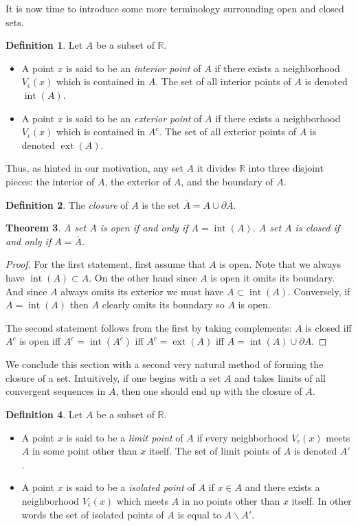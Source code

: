 \documentclass[11pt,oneside]{amsbook}
\newcommand{\RR}{\mathbb R}
\DeclareMathOperator{\inte}{int}
\DeclareMathOperator{\ext}{ext}
\theoremstyle{definition}
\theoremstyle{plain}
\newtheorem{thm}{Theorem}[section]
\theoremstyle{definition}
\newtheorem{defn}[thm]{Definition}
\theoremstyle{remark}
\numberwithin{equation}{section}
\numberwithin{figure}{section}
\begin{document}
It is now time to introduce some more terminology surrounding open and closed sets.

\begin{defn}
  Let $A$ be a subset of $\RR$.
  \begin{itemize}
  \item A point $x$ is said to be an \emph{interior point} of $A$ if there exists a neighborhood $V_\epsilon(x)$ which is contained in $A$. The set of all interior points of $A$ is denoted $\inte(A)$.
  \item A point $x$ is said to be an \emph{exterior point} of $A$ if there exists a neighborhood $V_\epsilon(x)$ which is contained in $A^c$. The set of all exterior points of $A$ is denoted $\ext(A)$.
  \end{itemize}
\end{defn}

Thus, as hinted in our motivation, any set $A$ it divides $\RR$ into three disjoint pieces: the interior of $A$, the exterior of $A$, and the boundary of $A$.

\begin{defn}
  The \emph{closure} of $A$ is the set $\overline{A}=A\cup\partial A$.
\end{defn}

\begin{thm}
  \label{thm:closure}
  A set $A$ is open if and only if $A=\inte(A)$. A set $A$ is closed if and only if $A=\overline{A}$.
\end{thm}

\begin{proof}
  For the first statement, first assume that $A$ is open. Note that we always have $\inte(A)\subset A$. On the other hand since $A$ is open it omits its boundary. And since $A$ always omits its exterior we must have $A\subset\inte(A)$. Conversely, if $A=\inte(A)$ then $A$ clearly omits its boundary so $A$ is open.

  The second statement follows from the first by taking complements: $A$ is closed iff $A^c$ is open iff $A^c=\inte(A^c)$ iff $A^c=\ext(A)$ iff $A=\inte(A)\cup\partial A$.
\end{proof}

We conclude this section with a second very natural method of forming the closure of a set. Intuitively, if one begins with a set $A$ and takes limits of all convergent sequences in $A$, then one should end up with the closure of $A$.

\begin{defn}
  Let $A$ be a subset of $\RR$.
  \begin{itemize}
  \item A point $x$ is said to be a \emph{limit point} of $A$ if every neighborhood $V_\epsilon(x)$ meets $A$ in some point other than $x$ itself. The set of limit points of $A$ is denoted $A'$.
  \item A point $x$ is said to be a \emph{isolated point} of $A$ if $x\in A$ and there exists a neighborhood $V_\epsilon(x)$ which meets $A$ in no points other than $x$ itself. In other words the set of isolated points of $A$ is equal to $A\smallsetminus A'$.
  \end{itemize}
\end{defn}
\end{document}
